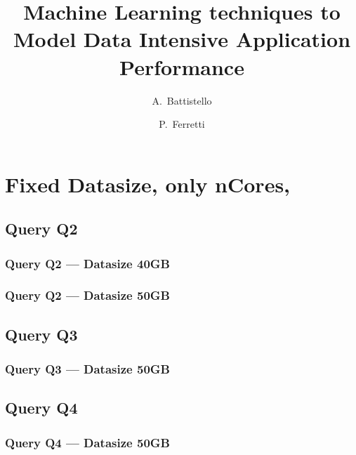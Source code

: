\documentclass[a4paper,11pt]{article}
\author{A.~Battistello\and P.~Ferretti}
\title{Machine Learning techniques to Model Data Intensive Application Performance}
\date{}
\begin{document}
\maketitle
\tableofcontents



\newpage
\section{Fixed Datasize, only nCores,}
\subsection{Query Q2}
\subsubsection{Query Q2 --- Datasize 40GB}



\newpage
\subsubsection{Query Q2 --- Datasize 50GB}



\newpage

\subsection{Query Q3}
\subsubsection{Query Q3 --- Datasize 50GB}



\newpage

\subsection{Query Q4}
\subsubsection{Query Q4 --- Datasize 50GB}



\newpage
\end{document}
